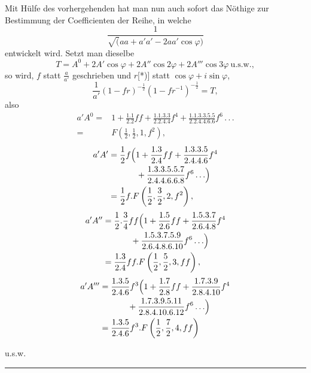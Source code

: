 \begingroup
\makeatletter\tagsleft@true\let\veqno\@@leqno\makeatother
{}
\noindent {\small [S. 42]}\par
Mit Hülfe des vorhergehenden hat man nun auch sofort das Nöthige zur Bestimmung der Coefficienten der Reihe, in welche
\[\frac{1}{\surd(aa+a'a'-2aa'\cos\varphi)}\]
\noindent entwickelt wird. Setzt man dieselbe
\[T=A^0+2A'\cos\varphi+2A''\cos2\varphi+2A'''\cos3\varphi\ \text{u.s.w.},\]
\noindent so wird, $f$ statt $\frac{a}{a'}$ geschrieben und $r$[*)] statt $\cos\varphi+i\sin\varphi$,
\[\frac{1}{a'}(1-fr)^{-\frac12}(1-fr^{-1})^{-\frac12}=T,\]
\noindent also
\[
\begin{aligned}
a'A^0={}&1+\frac{1{.}1}{2{.}2}ff+\frac{1{.}1{.}3{.}3}{2{.}2{.}4{.}4}f^4
 +\frac{1{.}1{.}3{.}3{.}5{.}5}{2{.}2{.}4{.}4{.}6{.}6}f^6\,{.}\,{.}\,{.}\\
={}&F\left(\frac12,\frac12,1,f^2\right),
\end{aligned}
\]
\[
\begin{aligned}
a'A'={}&\frac12 f\Bigl(1+\frac{1{.}3}{2{.}4}ff+\frac{1{.}3{.}3{.}5}{2{.}4{.}4{.}6}f^4\\
&\qquad+\frac{1{.}3{.}3{.}5{.}5{.}7}{2{.}4{.}4{.}6{.}6{.}8}f^6\,{.}\,{.}\,{.}\Bigr)\\
={}&\frac12 f{.}F\left(\frac12,\frac32,2,f^2\right),
\end{aligned}
\]
\[
\begin{aligned}
a'A''={}&\frac12{.}\frac34 ff\Bigl(1+\frac{1{.}5}{2{.}6}ff+\frac{1{.}5{.}3{.}7}{2{.}6{.}4{.}8}f^4\\
&\qquad+\frac{1{.}5{.}3{.}7{.}5{.}9}{2{.}6{.}4{.}8{.}6{.}10}f^6\,{.}\,{.}\,{.}\Bigr)\\
={}&\frac{1{.}3}{2{.}4}ff{.}F\left(\frac12,\frac52,3,ff\right),
\end{aligned}
\]
\[
\begin{aligned}
a'A'''={}&\frac{1{.}3{.}5}{2{.}4{.}6}f^3\Bigl(1+\frac{1{.}7}{2{.}8}ff+\frac{1{.}7{.}3{.}9}{2{.}8{.}4{.}10}f^4\\
&\qquad+\frac{1{.}7{.}3{.}9{.}5{.}11}{2{.}8{.}4{.}10{.}6{.}12}f^6\,{.}\,{.}\,{.}\Bigr)\\
={}&\frac{1{.}3{.}5}{2{.}4{.}6}f^3{.}F\left(\frac12,\frac72,4,ff\right)
\end{aligned}
\]
\centerline{u.s.w.}
\par\medskip\noindent\rule{.25\linewidth}{.4pt}\par\smallskip
{\small{}}
